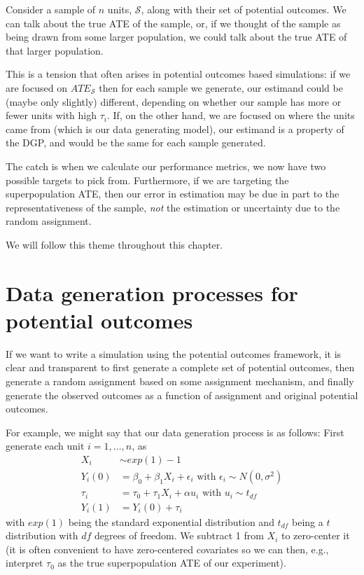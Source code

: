 \documentclass[
]{book}
\begin{document}
Consider a sample of \(n\) units, \(\mathcal{S}\), along with their set of potential outcomes.
We can talk about the true ATE of the sample, or, if we thought of the sample as being drawn from some larger population, we could talk about the true ATE of that larger population.

This is a tension that often arises in potential outcomes based simulations: if we are focused on \(ATE_{\mathcal{S}}\) then for each sample we generate, our estimand could be (maybe only slightly) different, depending on whether our sample has more or fewer units with high \(\tau_i\).
If, on the other hand, we are focused on where the units came from (which is our data generating model), our estimand is a property of the DGP, and would be the same for each sample generated.

The catch is when we calculate our performance metrics, we now have two possible targets to pick from.
Furthermore, if we are targeting the superpopulation ATE, then our error in estimation may be due in part to the representativeness of the sample, \emph{not} the estimation or uncertainty due to the random assignment.

We will follow this theme throughout this chapter.

\hypertarget{data-generation-processes-for-potential-outcomes}{%
\section{Data generation processes for potential outcomes}\label{data-generation-processes-for-potential-outcomes}}

If we want to write a simulation using the potential outcomes framework, it is clear and transparent to first generate a complete set of potential outcomes, then generate a random assignment based on some assignment mechanism, and finally generate the observed outcomes as a function of assignment and original potential outcomes.

For example, we might say that our data generation process is as follows: First generate each unit \(i = 1, \ldots, n\), as
\[
\begin{aligned}
X_i &\sim exp( 1 ) - 1 \\
Y_i(0) &= \beta_0 + \beta_1 X_i + \epsilon_i \mbox{ with } \epsilon_i \sim N( 0, \sigma^2 ) \\
\tau_i &= \tau_0 + \tau_1 X_i + \alpha u_i \mbox{ with } u_i \sim t_{df} \\
Y_i(1) &= Y_i(0) + \tau_i 
\end{aligned}
\]
with \(exp(1)\) being the standard exponential distribution and \(t_{df}\) being a \(t\) distribution with \(df\) degrees of freedom.
We subtract 1 from \(X_i\) to zero-center it (it is often convenient to have zero-centered covariates so we can then, e.g., interpret \(\tau_0\) as the true superpopulation ATE of our experiment).
\end{document}
